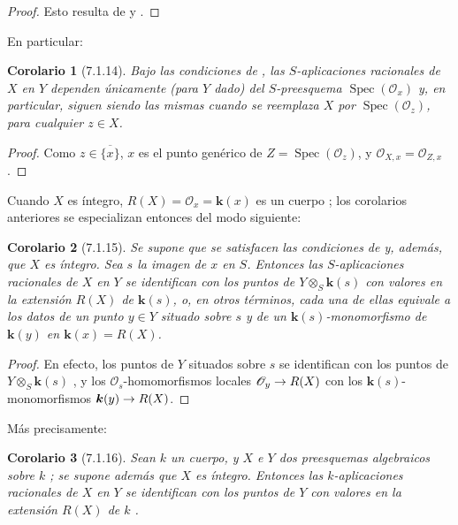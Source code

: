 \documentclass[oneside]{amsart}
\theoremstyle{ega-env-style}
\theoremstyle{ega-thm-env-style}
\newtheorem*{corollary}{Corolario}
\theoremstyle{ega-defn-env-style}
\renewcommand{\to}{\mathchoice{\longrightarrow}{\rightarrow}{\rightarrow}{\rightarrow}}
\let\EGAOriginalLabel\label
\renewcommand{\label}[1]{\phantomsection\EGAOriginalLabel{#1}}
\begin{document}
\begin{proof}
Esto resulta de  y .
\end{proof}

En particular:
\begin{corollary}[7.1.14]
\label{I.7.1.14}
Bajo las condiciones de , las $S$-aplicaciones racionales de $X$ en $Y$ dependen únicamente (para $Y$ dado) del $S$-preesquema $\operatorname{Spec}(\mathscr{O}_x)$ y, en particular, siguen siendo las mismas cuando se reemplaza $X$ por $\operatorname{Spec}(\mathscr{O}_z)$, para cualquier $z\in X$.
\end{corollary}

\begin{proof}
Como $z\in\overline{\{x\}}$, $x$ es el punto genérico de $Z=\operatorname{Spec}(\mathscr{O}_z)$, y $\mathscr{O}_{X,x}=\mathscr{O}_{Z,x}$.
\end{proof}

Cuando $X$ es íntegro, $R(X)=\mathscr{O}_x=\boldsymbol{k}(x)$ es un cuerpo ; los corolarios anteriores se especializan entonces del modo siguiente:
\begin{corollary}[7.1.15]
\label{I.7.1.15}
Se supone que se satisfacen las condiciones de  y, además, que $X$ es íntegro.
Sea $s$ la imagen de $x$ en $S$.
Entonces las $S$-aplicaciones racionales de $X$ en $Y$ se identifican con los puntos de $Y\otimes_S \boldsymbol{k}(s)$ con valores en la extensión $R(X)$ de $\boldsymbol{k}(s)$, o, en otros términos, cada una de ellas equivale a los datos de un punto $y\in Y$ situado sobre $s$ y de un $\boldsymbol{k}(s)$-monomorfismo de $\boldsymbol{k}(y)$ en $\boldsymbol{k}(x)=R(X)$.
\end{corollary}

\begin{proof}
En efecto, los puntos de $Y$ situados sobre $s$ se identifican con los puntos de $Y\otimes_S \boldsymbol{k}(s)$ , y los $\mathscr{O}_s$-homomorfismos locales $\mathscr{O}_y\to R(X)$ con los $\boldsymbol{k}(s)$-monomorfismos $\boldsymbol{k}(y)\to R(X)$.
\end{proof}

Más precisamente:
\begin{corollary}[7.1.16]
\label{I.7.1.16}
Sean $k$ un cuerpo, y $X$ e $Y$ dos preesquemas algebraicos sobre $k$ ; se supone además que $X$ es íntegro.
Entonces las $k$-aplicaciones racionales de $X$ en $Y$ se identifican con los puntos de $Y$ con valores en la extensión $R(X)$ de $k$ .
\end{corollary}
\end{document}
